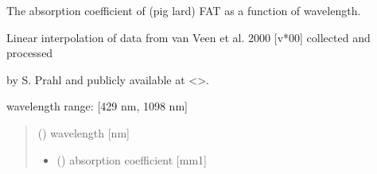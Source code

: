 \documentclass[letterpaper,10pt,english]{sphinxmanual}
\begin{document}
\begin{fulllineitems}
\label{\detokenize{03_absorption_coefficient:skinoptics.absorption_coefficient.mua_fat_vanVeen}}
\pysigstartsignatures
{}
\pysigstopsignatures
\begin{DUlineblock}{0em}
\item[] The absorption coefficient of (pig lard) FAT as a function of wavelength.
\item[] Linear interpolation of data from van Veen et al. 2000 {[}v*00{]} collected and processed
\item[] by S. Prahl and publicly available at \textless{}\textgreater{}.
\end{DUlineblock}

\begin{DUlineblock}{0em}
\item[] wavelength range: {[}429 nm, 1098 nm{]}
\end{DUlineblock}
\begin{quote}\begin{description}
\sphinxAtStartPar
{} () \textendash{} wavelength {[}nm{]}

\sphinxAtStartPar
\begin{itemize}
\item {} 
\sphinxAtStartPar
{} () \textendash{} absorption coefficient {[}mm\sphinxhyphen{}1{]}

\end{itemize}


\end{description}\end{quote}

\end{fulllineitems}

\end{document}

